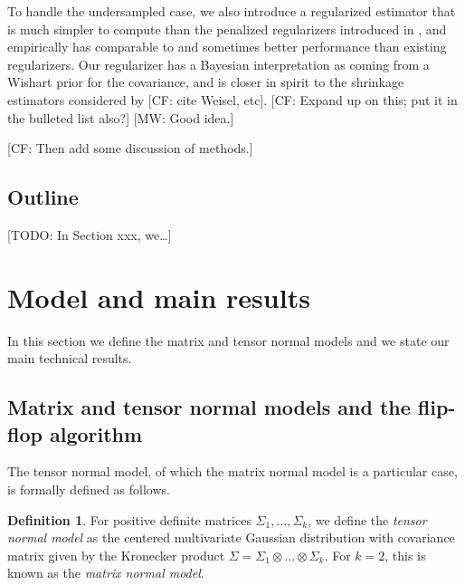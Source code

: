 \documentclass[aos]{imsart}
\theoremstyle{definition}
\newtheorem{definition}{Definition}
\newcommand{\ot}{\otimes}
\newcommand{\CF}[1]{{\color{purple}[CF: #1]}}
\newcommand{\MW}[1]{{\color{red}[MW: #1]}}
\newcommand{\TODO}[1]{{\color{blue}[TODO: #1]}}
\begin{document}
To handle the undersampled case, we also introduce a regularized estimator that is much simpler to compute than the penalized regularizers introduced in \cite{tsiligkaridis2013convergence,sun2015nonconvex,zhou2014gemini}, and empirically has comparable to and sometimes better performance than existing regularizers.
Our regularizer has a Bayesian interpretation as coming from a Wishart prior for the covariance, and is closer in spirit to the shrinkage estimators considered by \CF{cite Weisel, etc}.
\CF{Expand up on this; put it in the bulleted list also?}
\MW{Good idea.}

\CF{Then add some discussion of methods.}

\subsection{Outline}
\TODO{In Section xxx, we\dots}

\section{Model and main results}
In this section we define the matrix and tensor normal models and we state our main technical results.

\subsection{Matrix and tensor normal models and the flip-flop algorithm}
The tensor normal model, of which the matrix normal model is a particular case, is formally defined as follows.

\begin{definition}
For positive definite matrices $\Sigma_1,\dots,\Sigma_k$, we define the \emph{tensor normal model} as the centered multivariate Gaussian distribution with covariance matrix given by the Kronecker product $\Sigma = \Sigma_1 \ot \dots \ot \Sigma_k$.
For $k=2$, this is known as the \emph{matrix normal model}.
\end{definition}
\end{document}
